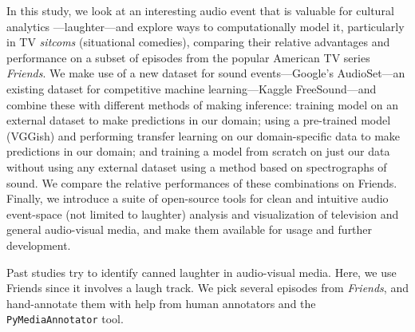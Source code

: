 \documentclass[12pt]{article}
\begin{document}
In this study, we look at an interesting audio event that is valuable for
cultural analytics \cite{manovich2001language}---laughter---and explore ways to
computationally model it, particularly in TV {\itshape sitcoms} (situational
comedies), comparing their relative advantages and performance on a subset of
episodes from the popular American TV series {\itshape Friends}.  We make use
of a new dataset for sound events---Google's AudioSet---an existing dataset for
competitive machine learning---Kaggle FreeSound---and combine these with
different methods of making inference: training model on an external dataset to
make predictions in our domain; using a pre-trained model (VGGish) \cite{45611}
and performing transfer learning on our domain-specific data to make
predictions in our domain; and training a model from scratch on just our data
without using any external dataset using a method based on spectrographs of
sound. We compare the relative performances of these combinations on Friends.
Finally, we introduce a suite of open-source tools for clean and intuitive
audio event-space (not limited to laughter) analysis and visualization of
television and general audio-visual media, and make them available for usage
and further development.

Past studies try to identify canned laughter \cite{affective} in audio-visual
media. Here, we use Friends since it involves a laugh track.
We pick several episodes from \textit{Friends}, and hand-annotate them
with help from human annotators and the \texttt{PyMediaAnnotator} tool.
\end{document}

